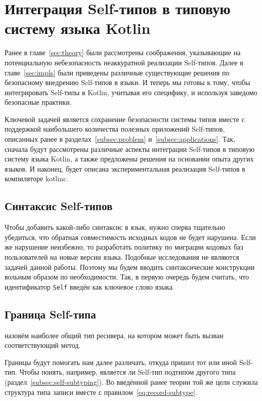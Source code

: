\section{Интеграция Self-типов в типовую систему языка Kotlin} \label{sec:integration}

Ранее в главе~\ref{sec:theory} были рассмотрены соображения, указывающие на потенциальную небезопасность неаккуратной реализации Self-типов.
Далее в главе~\ref{sec:impls} были приведены различные существующие решения по безопасному внедрению Self-типов в языки.
И теперь мы готовы к тому, чтобы интегрировать Self-типы в Kotlin, учитывая его специфику, и используя заведомо безопасные практики.

Ключевой задачей является сохранение безопасности системы типов вместе с поддержкой наибольшего количества полезных приложений Self-типов, описанных ранее в разделах~\ref{subsec:problem} и~\ref{subsec:applications}.
Так, сначала будут рассмотрены различные аспекты интеграции Self-типов в типовую систему языка Kotlin, а также предложены решения на основании опыта других языков.
И наконец, будет описана экспериментальная реализация Self-типов в компиляторе kotlinc.


\subsection{Синтаксис Self-типов} \label{subsec:syntax}

Чтобы добавить какой-либо синтаксис в язык, нужно сперва тщательно убедиться, что обратная совместимость исходных кодов не будет нарушена.
Если же нарушение неизбежно, то разработать политику по миграции кодовых баз пользователей на новые версии языка.
Подобные исследования не являются задачей данной работы.
Поэтому мы будем вводить синтаксические конструкции вольным образом по необходимости.
Так, в первую очередь будем считать, что идентификатор \texttt{Self} введён как ключевое слово языка.


\subsection{Граница Self-типа} \label{subsec:bound}

\begin{definition}
    \label{def:bound}
     назовём наиболее общий тип ресивера, на котором может быть вызван соответствующий метод.
\end{definition}

Границы будут помогать нам далее различать, откуда пришел тот или иной Self-тип.
Чтобы понять, например, является ли Self-тип подтипом другого типа (раздел~\ref{subsec:self-subtyping}).
Во введённой ранее теории той же цели служила структура типа записи вместе с правилом~\eqref{eq:record-subtype}.

